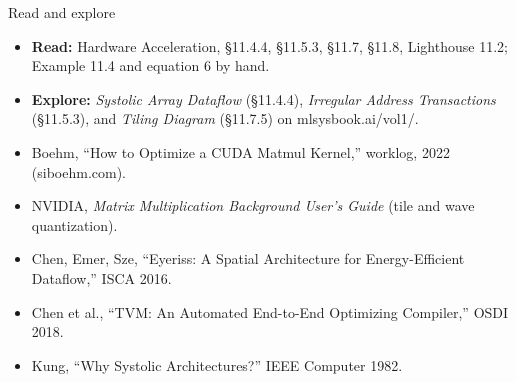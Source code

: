 \documentclass[aspectratio=169, 12pt]{beamer}
\begin{document}
\begin{frame}{Read and explore}
  \footnotesize
  \begin{itemize}\setlength{\itemsep}{0.05cm}
    \item \textbf{Read:} Hardware Acceleration, \S11.4.4, \S11.5.3, \S11.7, \S11.8, Lighthouse 11.2; Example 11.4 and equation 6 by hand.
    \item \textbf{Explore:} \textit{Systolic Array Dataflow} (\S11.4.4), \textit{Irregular Address Transactions} (\S11.5.3), and \textit{Tiling Diagram} (\S11.7.5) on mlsysbook.ai/vol1/.
    \item Boehm, ``How to Optimize a CUDA Matmul Kernel,'' worklog, 2022 (siboehm.com).
    \item NVIDIA, \emph{Matrix Multiplication Background User's Guide} (tile and wave quantization).
    \item Chen, Emer, Sze, ``Eyeriss: A Spatial Architecture for Energy-Efficient Dataflow,'' ISCA 2016.
    \item Chen et al., ``TVM: An Automated End-to-End Optimizing Compiler,'' OSDI 2018.
    \item Kung, ``Why Systolic Architectures?'' IEEE Computer 1982.
  \end{itemize}
\end{frame}
\end{document}
